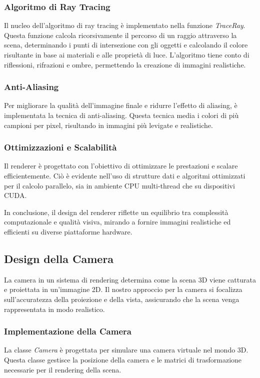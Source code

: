 \documentclass[12pt]{article}
\begin{document}
\subsubsection{Algoritmo di Ray Tracing}
Il nucleo dell'algoritmo di ray tracing è implementato nella funzione \textit{TraceRay}. Questa funzione calcola ricorsivamente il percorso di un raggio attraverso la scena, determinando i punti di intersezione con gli oggetti e calcolando il colore risultante in base ai materiali e alle proprietà di luce. L'algoritmo tiene conto di riflessioni, rifrazioni e ombre, permettendo la creazione di immagini realistiche.

\subsubsection{Anti-Aliasing}
Per migliorare la qualità dell'immagine finale e ridurre l'effetto di aliasing, è implementata la tecnica di anti-aliasing. Questa tecnica media i colori di più campioni per pixel, risultando in immagini più levigate e realistiche.

\subsubsection{Ottimizzazioni e Scalabilità}
Il renderer è progettato con l'obiettivo di ottimizzare le prestazioni e scalare efficientemente. Ciò è evidente nell'uso di strutture dati e algoritmi ottimizzati per il calcolo parallelo, sia in ambiente CPU multi-thread che su dispositivi CUDA.

In conclusione, il design del renderer riflette un equilibrio tra complessità computazionale e qualità visiva, mirando a fornire immagini realistiche ed efficienti su diverse piattaforme hardware.


\subsection{Design della Camera}
La camera in un sistema di rendering determina come la scena 3D viene catturata e proiettata in un'immagine 2D. Il nostro approccio per la camera si focalizza sull'accuratezza della proiezione e della vista, assicurando che la scena venga rappresentata in modo realistico.

\subsubsection{Implementazione della Camera}
La classe \textit{Camera} è progettata per simulare una camera virtuale nel mondo 3D. Questa classe gestisce la posizione della camera e le matrici di trasformazione necessarie per il rendering della scena.
\end{document}
